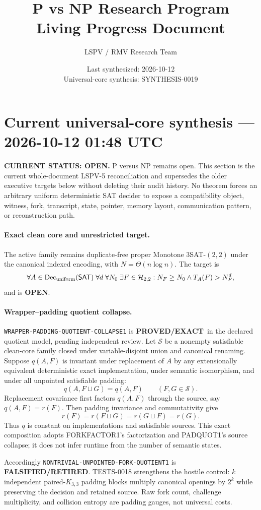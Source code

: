 \documentclass[11pt]{article}
\title{\bfseries P vs NP Research Program\\[0.25em]
\Large Living Progress Document}
\author{LSPV / RMV Research Team}
\date{Last synthesized: 2026-10-12\\ Universal-core synthesis: SYNTHESIS-0019}
\newcommand{\statusproved}{\textcolor{proved}{\textbf{PROVED/EXACT}}}
\newcommand{\statusopen}{\textcolor{openstatus}{\textbf{OPEN}}}
\newcommand{\statusretired}{\textcolor{retired}{\textbf{FALSIFIED/RETIRED}}}
\begin{document}
\section{Current universal-core synthesis --- 2026-10-12 01:48 UTC}

\begin{statusbox}
\textbf{CURRENT STATUS: OPEN.} P versus NP remains open. This section is the
current whole-document LSPV-5 reconciliation and supersedes the older
executive targets below without deleting their audit history. No theorem
forces an arbitrary uniform deterministic SAT decider to expose a
compatibility object, witness, fork, transcript, state, pointer, memory
layout, communication pattern, or reconstruction path.
\end{statusbox}

\paragraph{Exact clean core and unrestricted target.}
The active family remains duplicate-free proper Monotone $3$SAT-$(2,2)$ under
the canonical indexed encoding, with $N=\Theta(n\log n)$. The target is
\[
 \forall A\in\operatorname{Dec}_{\rm uniform}(\mathsf{SAT})\;
 \forall d\;\forall N_0\;\exists F\in\mathcal H_{2,2}:
 N_F\ge N_0\land T_A(F)>N_F^d,
\]
and is \statusopen.

\paragraph{Wrapper--padding quotient collapse.}
\texttt{WRAPPER-PADDING-QUOTIENT-COLLAPSE1} is \statusproved\ in the
declared quotient model, pending independent review. Let $\mathcal S$ be a
nonempty satisfiable clean-core family closed under variable-disjoint union
and canonical renaming. Suppose $q(A,F)$ is invariant under replacement of
$A$ by any extensionally equivalent deterministic exact implementation,
under semantic isomorphism, and under all unpointed satisfiable padding:
\[
 q(A,F\sqcup G)=q(A,F)\qquad(F,G\in\mathcal S).
\]
Replacement covariance first factors $q(A,F)$ through the source, say
$q(A,F)=r(F)$. Then padding invariance and commutativity give
\[
 r(F)=r(F\sqcup G)=r(G\sqcup F)=r(G).
\]
Thus $q$ is constant on implementations and satisfiable sources. This exact
composition adopts FORKFACTOR1's factorization and PADQUOT1's source collapse;
it does not infer runtime from the number of semantic states.

Accordingly \texttt{NONTRIVIAL-UNPOINTED-FORK-QUOTIENT1} is
\statusretired. TESTS-0018 strengthens the hostile control: $k$ independent
paired-$K_{3,3}$ padding blocks multiply canonical openings by $2^k$ while
preserving the decision and retained source. Raw fork count, challenge
multiplicity, and collision entropy are padding gauges, not universal costs.
\end{document}
